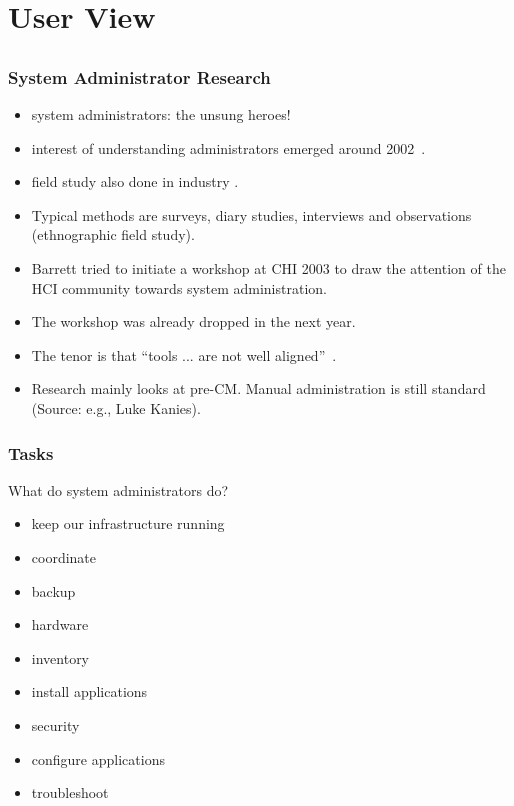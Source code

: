 \section{User View}

\subsection{}


\begin{frame}
	\frametitle{System Administrator Research}

	\begin{itemize}[<+-| alert@+>]
	\item system administrators: the unsung heroes!
	\item interest of understanding administrators emerged around 2002~\cite{anderson2002researching}.
	\item field study also done in industry \cite{barrett2004field}.
	\item Typical methods are surveys, diary studies, interviews and observations (ethnographic field study).
	\item Barrett \cite{barrett2003system} tried to initiate a workshop at CHI 2003 to draw the attention of the HCI community towards system administration.
	\item The workshop was already dropped in the next year.
	\item The tenor is that ``tools ... are not well aligned''~\cite{haber2007design}.
	\item Research mainly looks at pre-CM. Manual administration is still standard (Source: e.g., Luke Kanies).
	\end{itemize}
\end{frame}

\begin{frame}
	\frametitle{Tasks}

	What do system administrators do?

	\begin{itemize}[<+-| alert@+>]
	\item keep our infrastructure running
	\item coordinate
	\item backup
	\item hardware
	\item inventory
	\item install applications
	\item security
	\item configure applications
	\item troubleshoot
	\end{itemize}
\end{frame}


